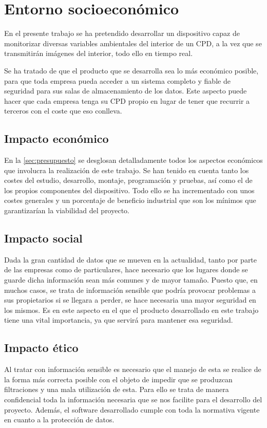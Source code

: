 \chapter{Entorno socioeconómico}\label{ch:entornoSocioEconomico}
En el presente trabajo se ha pretendido desarrollar un dispositivo capaz de monitorizar diversas variables ambientales del interior de un CPD, a la vez que se transmitirán imágenes del interior, todo ello en tiempo real.

Se ha tratado de que el producto que se desarrolla sea lo más económico posible, para que toda empresa pueda acceder a un sistema completo y fiable de seguridad para sus salas de almacenamiento de los datos. Este aspecto puede hacer que cada empresa tenga su CPD propio en lugar de tener que recurrir a terceros con el coste que eso conlleva.

\section{Impacto económico}\label{sec:impacto-económico}
En la \autoref{sec:presupuesto} se desglosan detalladamente todos los aspectos económicos que involucra la realización de este trabajo. Se han tenido en cuenta tanto los costes del estudio, desarrollo, montaje, programación y pruebas, así como el de los propios componentes del dispositivo. Todo ello se ha incrementado con unos costes generales y un porcentaje de beneficio industrial que son los mínimos que garantizarían la viabilidad del proyecto.

\section{Impacto social}\label{sec:impacto-social}
Dada la gran cantidad de datos que se mueven en la actualidad, tanto por parte de las empresas como de particulares, hace necesario que los lugares donde se guarde dicha información sean más comunes y de mayor tamaño. Puesto que, en muchos casos, se trata de información sensible que podría provocar problemas a sus propietarios si se llegara a perder, se hace necesaria una mayor seguridad en los mismos. Es en este aspecto en el que el producto desarrollado en este trabajo tiene una vital importancia, ya que servirá para mantener esa seguridad.

\section{Impacto ético}\label{sec:impacto-ético}
Al tratar con información sensible es necesario que el manejo de esta se realice de la forma más correcta posible con el objeto de impedir que se produzcan filtraciones y una mala utilización de esta. Para ello se trata de manera confidencial toda la información necesaria que se nos facilite para el desarrollo del proyecto. Además, el software desarrollado cumple con toda la normativa vigente en cuanto a la protección de datos.

